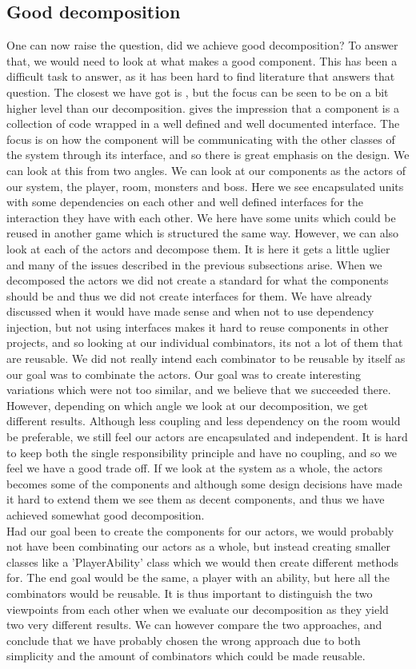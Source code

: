 \subsection{Good decomposition}
One can now raise the question, did we achieve good decomposition? To answer that, we would need to look at what makes a good component. This has been a difficult task to answer, as it has been hard to find literature that answers that question. The closest we have got is \cite{Components}, but the focus can be seen to be on a bit higher level than our decomposition. \cite{Components} gives the impression that a component is a collection of code wrapped in a well defined and well documented interface. The focus is on how the component will be communicating with the other classes of the system through its interface, and so there is great emphasis on the design. We can look at this from two angles. We can look at our components as the actors of our system, the player, room, monsters and boss. Here we see encapsulated units with some dependencies on each other and well defined interfaces for the interaction they have with each other. We here have some units which could be reused in another game which is structured the same way. However, we can also look at each of the actors and decompose them. It is here it gets a little uglier and many of the issues described in the previous subsections arise. When we decomposed the actors we did not create a standard for what the components should be and thus we did not create interfaces for them. We have already discussed when it would have made sense and when not to use dependency injection, but not using interfaces makes it hard to reuse components in other projects, and so looking at our individual combinators, its not a lot of them that are reusable. We did not really intend each combinator to be reusable by itself as our goal was to combinate the actors. Our goal was to create interesting variations which were not too similar, and we believe that we succeeded there. However, depending on which angle we look at our decomposition, we get different results. Although less coupling and less dependency on the room would be preferable, we still feel our actors are encapsulated and independent. It is hard to keep both the single responsibility principle and have no coupling, and so we feel we have a good trade off. If we look at the system as a whole, the actors becomes some of the components and although some design decisions have made it hard to extend them we see them as decent components, and thus we have achieved somewhat good decomposition.\\
Had our goal been to create the components for our actors, we would probably not have been combinating our actors as a whole, but instead creating smaller classes like a 'PlayerAbility' class which we would then create different methods for. The end goal would be the same, a player with an ability, but here all the combinators would be reusable. It is thus important to distinguish the two viewpoints from each other when we evaluate our decomposition as they yield two very different results. We can however compare the two approaches, and conclude that we have probably chosen the wrong approach due to both simplicity and the amount of combinators which could be made reusable.